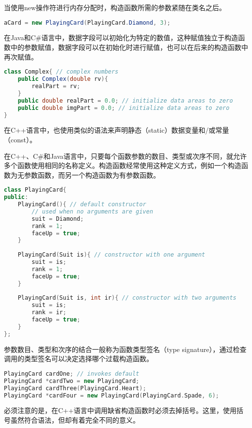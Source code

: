 当使用new操作符进行内存分配时，构造函数所需的参数紧随在类名之后。


\begin{lstlisting}[language=Java]
aCard = new PlayingCard(PlayingCard.Diamond, 3);
\end{lstlisting}

在Java和C\#语言中，数据字段可以初始化为特定的数值，这种赋值独立于构造函数中的参数赋值，数据字段可以在初始化时进行赋值，也可以在后来的构造函数中再次赋值。



\begin{lstlisting}[language=Java]
class Complex{ // complex numbers
	public Complex(double rv){
		realPart = rv;
	}
	public double realPart = 0.0; // initialize data areas to zero
	public double imgPart = 0.0; // initialize data areas to zero
}
\end{lstlisting}

在C++语言中，也使用类似的语法来声明静态（static）数据变量和/或常量（const）。

在C++、C\#和Java语言中，只要每个函数参数的数目、类型或次序不同，就允许多个函数使用相同的名称定义。构造函数经常使用这种定义方式，例如一个构造函数为无参数函数，而另一个构造函数为有参数函数。


\begin{lstlisting}[language=C++]
class PlayingCard{
public:
	PlayingCard(){ // default constructor
		// used when no arguments are given
		suit = Diamond;
		rank = 1;
		faceUp = true;
	}
	
	PlayingCard(Suit is){ // constructor with one argument
		suit = is;
		rank = 1;
		faceUp = true;
	}
	
	PlayingCard(Suit is, int ir){ // constructor with two arguments
		suit = is;
		rank = ir;
		faceUp = true;
	}
};
\end{lstlisting}


参数数目、类型和次序的结合一般称为函数类型签名（type signature），通过检查调用的类型签名可以决定选择哪个过载构造函数。


\begin{lstlisting}[language=C++]
PlayingCard cardOne; // invokes default
PlayingCard *cardTwo = new PlayingCard;
PlayingCard cardThree(PlayingCard.Heart);
PlayingCard *cardFour = new PlayingCard(PlayingCard.Spade, 6);
\end{lstlisting}

必须注意的是，在C++语言中调用缺省构造函数时必须去掉括号。这里，使用括号虽然符合语法，但却有着完全不同的意义。



